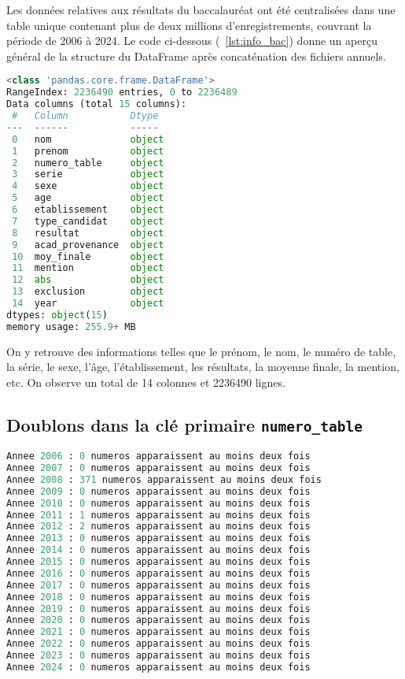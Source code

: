 Les données relatives aux résultats du baccalauréat ont été centralisées dans une table unique contenant plus de deux millions d’enregistrements, couvrant la période de 2006 à 2024. 
Le code ci-dessous (~\ref{lst:info_bac}) donne un aperçu général de la structure du DataFrame après concaténation des fichiers annuels.
\begin{lstlisting}[language=Python,
    caption=Informations général du DataFrame,
    label=lst:info_bac,
    basicstyle=\ttfamily\small,
    backgroundcolor=\color{gray!10}
]
<class 'pandas.core.frame.DataFrame'>
RangeIndex: 2236490 entries, 0 to 2236489
Data columns (total 15 columns):
 #   Column           Dtype 
---  ------           ----- 
 0   nom              object
 1   prenom           object
 2   numero_table     object
 3   serie            object
 4   sexe             object
 5   age              object
 6   etablissement    object
 7   type_candidat    object
 8   resultat         object
 9   acad_provenance  object
 10  moy_finale       object
 11  mention          object
 12  abs              object
 13  exclusion        object
 14  year             object
dtypes: object(15)
memory usage: 255.9+ MB
\end{lstlisting}

On y retrouve des informations telles que le prénom, le nom, le numéro de table, la série, le sexe, l’âge, l'établissement, les résultats, la moyenne finale, la mention, etc. 
On observe un total de 14 colonnes et 2236490 lignes.
\newpage
\subsection{Doublons dans la clé primaire \texttt{numero\_table}}

\begin{lstlisting}[language=Python,
    caption=Nombre de numero\_table en doublon par année,
    label=lst:doublons,
    basicstyle=\ttfamily\small,
    backgroundcolor=\color{gray!10}
]
Annee 2006 : 0 numeros apparaissent au moins deux fois
Annee 2007 : 0 numeros apparaissent au moins deux fois
Annee 2008 : 371 numeros apparaissent au moins deux fois
Annee 2009 : 0 numeros apparaissent au moins deux fois
Annee 2010 : 0 numeros apparaissent au moins deux fois
Annee 2011 : 1 numeros apparaissent au moins deux fois
Annee 2012 : 2 numeros apparaissent au moins deux fois
Annee 2013 : 0 numeros apparaissent au moins deux fois
Annee 2014 : 0 numeros apparaissent au moins deux fois
Annee 2015 : 0 numeros apparaissent au moins deux fois
Annee 2016 : 0 numeros apparaissent au moins deux fois
Annee 2017 : 0 numeros apparaissent au moins deux fois
Annee 2018 : 0 numeros apparaissent au moins deux fois
Annee 2019 : 0 numeros apparaissent au moins deux fois
Annee 2020 : 0 numeros apparaissent au moins deux fois
Annee 2021 : 0 numeros apparaissent au moins deux fois
Annee 2022 : 0 numeros apparaissent au moins deux fois
Annee 2023 : 0 numeros apparaissent au moins deux fois
Annee 2024 : 0 numeros apparaissent au moins deux fois 
\end{lstlisting}

